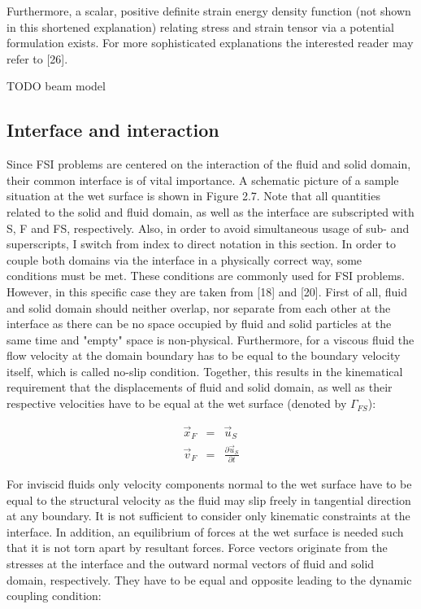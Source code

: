 Furthermore, a scalar, positive definite strain energy density function (not shown in this shortened
explanation) relating stress and strain tensor via a potential formulation exists.
For more sophisticated explanations the interested reader may refer to [26].

TODO beam model

\subsection{Interface and interaction}

Since FSI problems are centered on the interaction of the fluid and solid domain, their common interface
is of vital importance. A schematic picture of a sample situation at the wet surface is shown in Figure
2.7. Note that all quantities related to the solid and fluid domain, as well as the interface are subscripted
with S, F and FS, respectively. Also, in order to avoid simultaneous usage of sub- and superscripts, I
switch from index to direct notation in this section. In order to couple both domains via the interface
in a physically correct way, some conditions must be met. These conditions are commonly used for FSI
problems. However, in this specific case they are taken from [18] and [20].
First of all, fluid and solid domain should neither overlap, nor separate from each other at the interface
as there can be no space occupied by fluid and solid particles at the same time and "empty" space is non-physical. Furthermore, for a viscous fluid the flow velocity at the domain boundary has to be equal
to the boundary velocity itself, which is called no-slip condition. Together, this results in the kinematical
requirement that the displacements of fluid and solid domain, as well as their respective velocities have
to be equal at the wet surface (denoted by $\Gamma_{FS}$):

\begin{eqnarray}
 \vec{x}_F &=& \vec{u}_S \\
 \vec{v}_F &=& \frac{\partial \vec{u}_S}{\partial t}
\end{eqnarray}

For inviscid fluids only velocity components normal to the wet surface have to be equal to the structural
velocity as the fluid may slip freely in tangential direction at any boundary.
It is not sufficient to consider only kinematic constraints at the interface. In addition, an equilibrium
of forces at the wet surface is needed such that it is not torn apart by resultant forces. Force vectors
originate from the stresses at the interface and the outward normal vectors of fluid and solid domain,
respectively. They have to be equal and opposite leading to the dynamic coupling condition:

